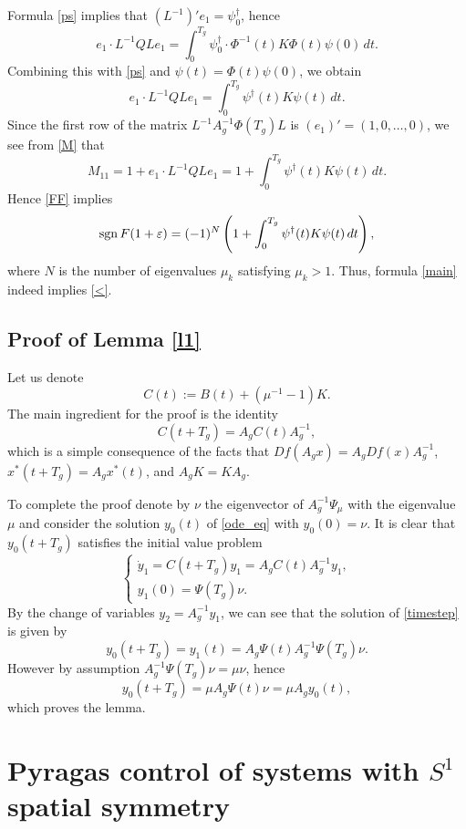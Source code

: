 \documentclass{article}
\let\epsilon\varepsilon
\let\varepsilon\epsilon
\def\endproof{\hfill $\square$}
\begin{document}
Formula \eqref{ps} implies that $(L^{-1})'e_1=\psi_0^\dagger$, hence
\[
e_1\cdot L^{-1} Q L e_1= \int_{0}^{T_g}  \psi_0^\dagger \cdot \Phi^{-1}(t)K \Phi(t) \psi(0) \,dt.
\]
Combining this with \eqref{ps} and $\psi(t)=\Phi(t)\psi(0)$, we obtain
\[
e_1\cdot L^{-1} Q L e_1= \int_{0}^{T_g}  \psi^\dagger(t) K \psi(t) \,dt.
\]
Since the first row of the matrix $L^{-1} A_g^{-1}\Phi(T_g)L$ is $(e_1)'=(1,0,\ldots,0)$, we see from \eqref{M} that
\[
M_{11}=1+e_1\cdot L^{-1} Q L e_1= 1+\int_{0}^{T_g}  \psi^\dagger(t) K \psi(t) \,dt.
\]
Hence \eqref{FF} implies 
\[
{\rm sgn}\, F(1+\epsilon)=(-1)^N \left( 1+\int_{0}^{T_g}  \psi^\dagger(t) K \psi(t) \,dt\right),
\]
where $N$ is the number of eigenvalues $\mu_k$ satisfying $\mu_k>1$.
Thus, formula \eqref{main} indeed implies \eqref{<}. %

\subsection{Proof of Lemma \ref{l1}}


Let us denote
$$
C(t):=B(t)+(\mu^{-1}-1)K.
$$
The main ingredient for the proof is the identity $$C(t+T_g) = A_gC(t)A_g^{-1},$$
which is a simple consequence of the facts that $Df(A_gx) = A_gDf(x)A_g^{-1}$, $x^*(t+T_g)=A_gx^*(t)$, and $A_g K= KA_g$.

To complete the proof denote by $\nu$ the eigenvector of $A_g^{-1}\Psi_\mu$ with the eigenvalue $\mu$ and consider the solution $y_0(t)$ of \eqref{ode_eq} with $y_0(0)=\nu$. It is clear that $y_0(t+T_g)$ satisfies
the initial value problem
\begin{equation}
\label{timestep}
\begin{cases}
\dot y_1 = C(t+T_g)y_1= A_gC(t)A_g^{-1}y_1,\\
y_1(0)= \Psi(T_g)\nu.
\end{cases}
\end{equation}
By the change of variables $y_2=A_g^{-1}y_1$, we can see that the solution of \eqref{timestep} is given by $$y_0(t+T_g)= y_1(t)= A_g\Psi(t)A_g^{-1}\Psi(T_g)\nu.$$
However by assumption $A_g^{-1}\Psi(T_g)\nu = \mu\nu$, hence
$$
y_0(t+T_g)=\mu A_g \Psi(t)\nu = \mu A_g y_0(t),
$$
which proves the lemma.

\section{Pyragas control of systems with $S^1$ spatial symmetry}
\end{document}
